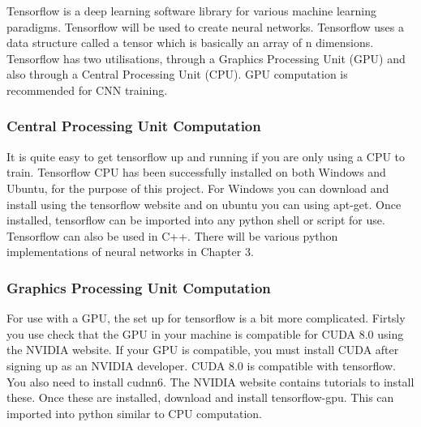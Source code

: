 Tensorflow is a deep learning software library for various machine learning paradigms. Tensorflow will be used to create neural networks.
Tensorflow uses a data structure called a tensor which is basically an array of n dimensions.
Tensorflow has two utilisations, through a Graphics Processing Unit (GPU) and
also through a Central Processing Unit (CPU).
GPU computation is recommended for CNN training. 

\subsubsection*{Central Processing Unit Computation}
It is quite easy to get tensorflow up and running if you are only using a CPU to
train. Tensorflow CPU has been successfully installed on both Windows and Ubuntu, for the purpose of this project.
For Windows you can download and install using the tensorflow website and on ubuntu you can
using apt-get. Once installed, tensorflow can be imported into any python shell
or script for use. Tensorflow can also be used in C++. There will be various
python implementations of neural networks in Chapter 3.

\subsubsection*{Graphics Processing Unit Computation}
For use with a GPU, the set up for tensorflow is a bit more complicated. Firtsly
you use check that the GPU in your machine is compatible for CUDA 8.0 using the
NVIDIA website. If your GPU is compatible, you must install CUDA after signing
up as an NVIDIA developer. CUDA 8.0 is compatible with tensorflow. You also need
to install cudnn6. The NVIDIA website contains tutorials to install these. Once
these are installed, download and install tensorflow-gpu. This can imported into
python similar to CPU computation.
